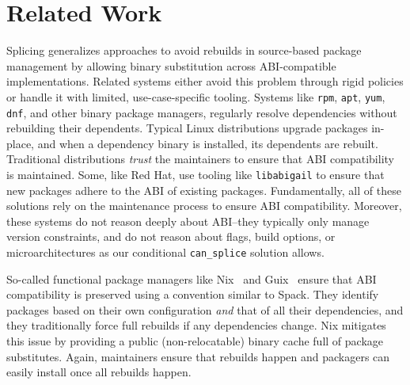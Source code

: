 \section{Related Work}
\label{sec:related}

Splicing generalizes approaches to avoid rebuilds in source-based package management by
allowing binary substitution across ABI-compatible implementations. Related systems
either avoid this problem through rigid policies or handle it with limited,
use-case-specific tooling. Systems like {\tt rpm}, {\tt apt}, {\tt yum}, {\tt dnf}, and
other binary package managers, regularly resolve dependencies without rebuilding their
dependents. Typical Linux distributions upgrade packages in-place, and when a dependency
binary is installed, its dependents are rebuilt. Traditional distributions {\it trust}
the maintainers to ensure that ABI compatibility is maintained. Some, like Red Hat, use
tooling like {\tt libabigail} to ensure that new packages adhere to the ABI of existing
packages. Fundamentally, all of these solutions rely on the maintenance process to
ensure ABI compatibility. Moreover, these systems do not reason deeply about ABI--they
typically only manage version constraints, and do not reason about flags, build options,
or microarchitectures as our conditional {\tt can\_splice} solution allows.

So-called functional package managers like Nix~\cite{dolstra2004nix,dolstra2008nixos}
and Guix~\cite{courtes-guix-2015} ensure that ABI compatibility is preserved using a
convention similar to Spack. They identify packages based on their own configuration
{\it and} that of all their dependencies, and they traditionally force full rebuilds if
any dependencies change. Nix mitigates this issue by providing a public
(non-relocatable) binary cache full of package substitutes. Again, maintainers ensure
that rebuilds happen and packagers can easily install once all rebuilds happen.

